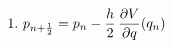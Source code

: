 \documentclass[preview]{standalone}
\begin{document}
\begin{align*}
\special{dvisvgm:raw <g id='unique000'>}1.\ p_{n+\frac{1}{2}} = p_n - \frac{h}{2}\,\frac{\partial V}{\partial q}(q_n)\special{dvisvgm:raw </g>}
\end{align*}
\end{document}
